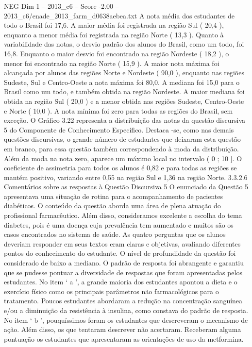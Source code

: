 \begin{textsample}{NEG Dim 1 – 2013\_c6 – Score -2.00 – 2013\_c6/enade\_2013\_farm\_d0638aebea.txt}
A nota média dos estudantes de todo o Brasil foi 17,6.
A maior média foi registrada na região Sul ( 20,4 ), enquanto a menor média foi registrada na região Norte ( 13,3 ).
Quanto à variabilidade das notas, o desvio padrão dos alunos do Brasil, como um todo, foi 16,8.
Enquanto o maior desvio foi encontrado na região Nordeste ( 18,2 ), o menor foi encontrado na região Norte ( 15,9 ).
A maior nota máxima foi alcançada por alunos das regiões Norte e Nordeste ( 90,0 ), enquanto nas regiões Sudeste, Sul e Centro-Oeste a nota máxima foi 80,0.
A mediana foi 15,0 para o Brasil como um todo, e também obtida na região Nordeste.
A maior mediana foi obtida na região Sul ( 20,0 ) e a menor obtida nas regiões Sudeste, Centro-Oeste e Norte ( 10,0 ).
A nota mínima foi zero para todas as regiões do Brasil, sem exceção.
O Gráfico 3.22 representa a distribuição das notas da questão discursiva 5 do Componente de Conhecimento Específico.
Destaca -se, como nas demais questões discursivas, o grande número de estudantes que deixaram esta questão em branco, para essa questão também correspondendo à moda da distribuição.
Além da moda na nota zero, aparece um máximo local no intervalo ( 0 ; 10 ].
O coeficiente de assimetria para todos os alunos é 0,82 e para todas as regiões se mantém positivo, variando entre 0,55 na região Sul e 1,36 na região Norte. 3.3.2.6 Comentários sobre as respostas à Questão Discursiva 5 O enunciado da Questão 5 apresentava uma situação de rotina para o acompanhamento de pacientes diabéticos.
O conteúdo da questão aborda uma área de plena atuação do profissional farmacêutico.
Além disso, consideramos excelente a escolha do tema diabetes, pois é uma doença cuja prevalência tem aumentado e muitos são os casos encontrados no sistema de saúde.
As quatro perguntas que os alunos deveriam responder em seus textos eram claras e objetivas, avaliando diferentes pontos do conhecimento do estudante.
O nível de profundidade da questão foi considerado de baixo a mediano.
O padrão de resposta foi abrangente e garantiu que se pudesse pontuar a diversidade de respostas que foram apresentadas pelos estudantes.
No item ‘ a ’, a grande maioria dos estudantes apontou a dieta e o exercício físico como os principais parâmetros não farmacológicos para o tratamento.
Poucos estudantes abordaram a redução na concentração sanguínea e/ou a diminuição da resistência à insulina, como constava do padrão de resposta.
No item ‘ b ’, pouquíssimos foram os estudantes que descreveram o mecanismo de ação.
Além disso, os que tentaram descrever não acertaram.
Receberam alguma pontuação os estudantes que apresentaram as orientações de uso da metformina.

\end{textsample}
